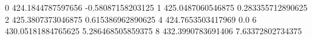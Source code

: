 0 424.1844787597656 -0.58087158203125
1 425.0487060546875 0.283355712890625
2 425.3807373046875 0.615386962890625
4 424.7653503417969 0.0
6 430.05181884765625 5.286468505859375
8 432.3990783691406 7.63372802734375

